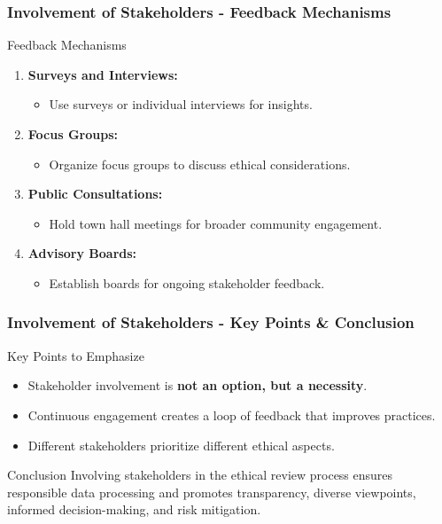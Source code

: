 \documentclass{beamer}
\begin{document}
\begin{frame}[fragile]
    \frametitle{Involvement of Stakeholders - Feedback Mechanisms}
    \begin{block}{Feedback Mechanisms}
        \begin{enumerate}
            \item \textbf{Surveys and Interviews:}
            \begin{itemize}
                \item Use surveys or individual interviews for insights.
            \end{itemize}
            \item \textbf{Focus Groups:}
            \begin{itemize}
                \item Organize focus groups to discuss ethical considerations.
            \end{itemize}
            \item \textbf{Public Consultations:}
            \begin{itemize}
                \item Hold town hall meetings for broader community engagement.
            \end{itemize}
            \item \textbf{Advisory Boards:}
            \begin{itemize}
                \item Establish boards for ongoing stakeholder feedback.
            \end{itemize}
        \end{enumerate}
    \end{block}
\end{frame}

\begin{frame}[fragile]
    \frametitle{Involvement of Stakeholders - Key Points & Conclusion}
    \begin{block}{Key Points to Emphasize}
        \begin{itemize}
            \item Stakeholder involvement is \textbf{not an option, but a necessity}.
            \item Continuous engagement creates a loop of feedback that improves practices.
            \item Different stakeholders prioritize different ethical aspects.
        \end{itemize}
    \end{block}
    \begin{block}{Conclusion}
        Involving stakeholders in the ethical review process ensures responsible data processing and promotes transparency, diverse viewpoints, informed decision-making, and risk mitigation.
    \end{block}
\end{frame}
\end{document}
